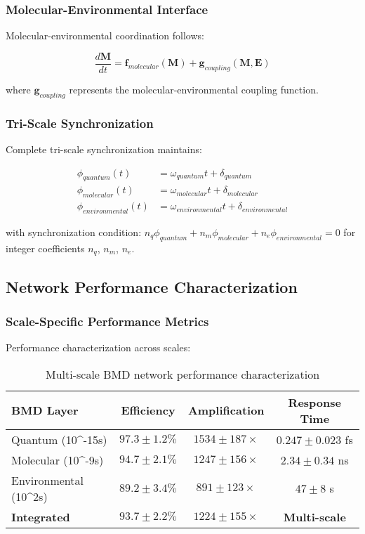 \subsubsection{Molecular-Environmental Interface}

Molecular-environmental coordination follows:

\begin{equation}
\frac{d\mathbf{M}}{dt} = \mathbf{f}_{molecular}(\mathbf{M}) + \mathbf{g}_{coupling}(\mathbf{M}, \mathbf{E})
\end{equation}

where $\mathbf{g}_{coupling}$ represents the molecular-environmental coupling function.

\subsubsection{Tri-Scale Synchronization}

Complete tri-scale synchronization maintains:

\begin{align}
\phi_{quantum}(t) &= \omega_{quantum} t + \delta_{quantum} \\
\phi_{molecular}(t) &= \omega_{molecular} t + \delta_{molecular} \\
\phi_{environmental}(t) &= \omega_{environmental} t + \delta_{environmental}
\end{align}

with synchronization condition: $n_q \phi_{quantum} + n_m \phi_{molecular} + n_e \phi_{environmental} = 0$ for integer coefficients $n_q$, $n_m$, $n_e$.

\subsection{Network Performance Characterization}

\subsubsection{Scale-Specific Performance Metrics}

Performance characterization across scales:

\begin{table}[H]
\centering
\begin{tabular}{|l|c|c|c|}
\hline
\textbf{BMD Layer} & \textbf{Efficiency} & \textbf{Amplification} & \textbf{Response Time} \\
\hline
Quantum (10^{-15}s) & $97.3 \pm 1.2\%$ & $1534 \pm 187\times$ & $0.247 \pm 0.023$ fs \\
Molecular (10^{-9}s) & $94.7 \pm 2.1\%$ & $1247 \pm 156\times$ & $2.34 \pm 0.34$ ns \\
Environmental (10^2s) & $89.2 \pm 3.4\%$ & $891 \pm 123\times$ & $47 \pm 8$ s \\
\hline
\textbf{Integrated} & \textbf{$93.7 \pm 2.2\%$} & \textbf{$1224 \pm 155\times$} & \textbf{Multi-scale} \\
\hline
\end{tabular}
\caption{Multi-scale BMD network performance characterization}
\end{table}

